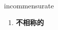 
\begin{frame}
{\huge incommensurate}
\begin{center}
\begin{enumerate}\Large
  \item \textbf{不相称的}
\end{enumerate}
\end{center}
\end{frame}
